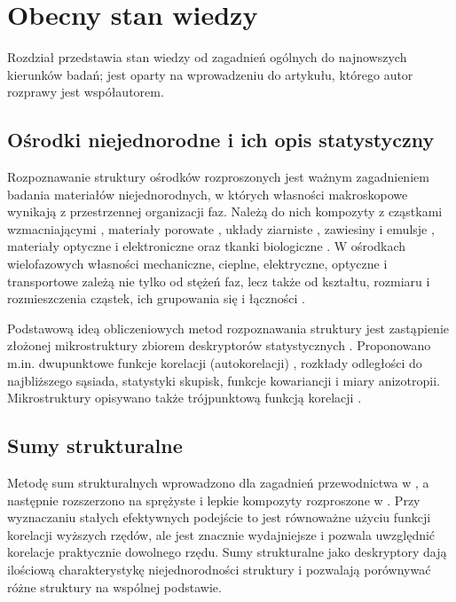 \documentclass[12pt,a4paper,twoside,openright]{report}
\theoremstyle{definition}
\theoremstyle{remark}
\newcommand{\ziel}[1]{{\color{green!50!black}#1}}
\begin{document}
\chapter{\texorpdfstring{\ziel{Obecny stan wiedzy}}{Obecny stan wiedzy}}\label{sec:stanwiedzy}
{\color{green!50!black}
Rozdział przedstawia stan wiedzy od zagadnień ogólnych do najnowszych kierunków badań; jest oparty na wprowadzeniu do artykułu, którego autor rozprawy jest współautorem.

\section{Ośrodki niejednorodne i ich opis statystyczny}
Rozpoznawanie struktury ośrodków rozproszonych jest ważnym zagadnieniem badania materiałów niejednorodnych, w których własności makroskopowe wynikają z przestrzennej organizacji faz. Należą do nich kompozyty z cząstkami wzmacniającymi \cite{cherkaev2012variational,milton2002theory}, materiały porowate \cite{adler2013fractures,adler2013porous}, układy ziarniste \cite{giorgio2023geometrically}, zawiesiny i emulsje \cite{mewis2012colloidal,gluzman2022asymptotics}, materiały optyczne i elektroniczne \cite{barczak2024anisotropy,andrianov2023approximate} oraz tkanki biologiczne \cite{czapla2016random,mityushev2017optimal,ligocki2024application}. W ośrodkach wielofazowych własności mechaniczne, cieplne, elektryczne, optyczne i transportowe zależą nie tylko od stężeń faz, lecz także od kształtu, rozmiaru i rozmieszczenia cząstek, ich grupowania się i łączności \cite{roding2020predicting}.

Podstawową ideą obliczeniowych metod rozpoznawania struktury jest zastąpienie złożonej mikrostruktury zbiorem deskryptorów statystycznych \cite{ohser2000statistical}. Proponowano m.in. dwupunktowe funkcje korelacji (autokorelacji) \cite{jiao2013modeling,li2023improved}, rozkłady odległości do najbliższego sąsiada, statystyki skupisk, funkcje kowariancji i miary anizotropii. Mikrostruktury opisywano także trójpunktową funkcją korelacji \cite{cheng2022data}.

\section{Sumy strukturalne}
Metodę sum strukturalnych wprowadzono dla zagadnień przewodnictwa w \cite{GMN}, a następnie rozszerzono na sprężyste i lepkie kompozyty rozproszone w \cite{drygas2019applied}. Przy wyznaczaniu stałych efektywnych podejście to jest równoważne użyciu funkcji korelacji wyższych rzędów, ale jest znacznie wydajniejsze i pozwala uwzględnić korelacje praktycznie dowolnego rzędu. Sumy strukturalne jako deskryptory dają ilościową charakterystykę niejednorodności struktury i pozwalają porównywać różne struktury na wspólnej podstawie.

}
\end{document}
